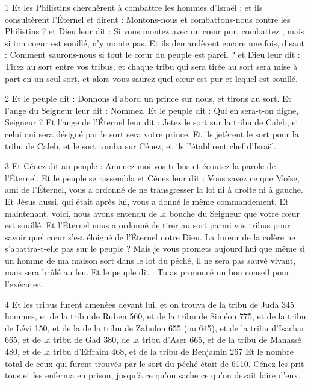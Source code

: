 
\par 1 Et les Philistins cherchèrent à combattre les hommes d'Israël ; et ils consultèrent l'Éternel et dirent : Montons-nous et combattons-nous contre les Philistins ? et Dieu leur dit : Si vous montez avec un cœur pur, combattez ; mais si ton coeur est souillé, n'y monte pas. Et ils demandèrent encore une fois, disant : Comment saurons-nous si tout le cœur du peuple est pareil ? et Dieu leur dit : Tirez au sort entre vos tribus, et chaque tribu qui sera tirée au sort sera mise à part en un seul sort, et alors vous saurez quel cœur est pur et lequel est souillé.

\par 2 Et le peuple dit : Donnons d'abord un prince sur nous, et tirons au sort. Et l'ange du Seigneur leur dit : Nommez. Et le peuple dit : Qui en sera-t-on digne, Seigneur ? Et l'ange de l'Éternel leur dit : Jetez le sort sur la tribu de Caleb, et celui qui sera désigné par le sort sera votre prince. Et ils jetèrent le sort pour la tribu de Caleb, et le sort tomba sur Cénez, et ils l'établirent chef d'Israël.

\par 3 Et Cénez dit au peuple : Amenez-moi vos tribus et écoutez la parole de l'Éternel. Et le peuple se rassembla et Cénez leur dit : Vous savez ce que Moïse, ami de l'Éternel, vous a ordonné de ne transgresser la loi ni à droite ni à gauche. Et Jésus aussi, qui était après lui, vous a donné le même commandement. Et maintenant, voici, nous avons entendu de la bouche du Seigneur que votre cœur est souillé. Et l'Éternel nous a ordonné de tirer au sort parmi vos tribus pour savoir quel cœur s'est éloigné de l'Éternel notre Dieu. La fureur de la colère ne s'abattra-t-elle pas sur le peuple ? Mais je vous promets aujourd'hui que même si un homme de ma maison sort dans le lot du péché, il ne sera pas sauvé vivant, mais sera brûlé au feu. Et le peuple dit : Tu as prononcé un bon conseil pour l'exécuter.

\par 4 Et les tribus furent amenées devant lui, et on trouva de la tribu de Juda 345 hommes, et de la tribu de Ruben 560, et de la tribu de Siméon 775, et de la tribu de Lévi 150, et de la de la tribu de Zabulon 655 (ou 645), et de la tribu d'Isachar 665, et de la tribu de Gad 380, de la tribu d'Aser 665, et de la tribu de Manassé 480, et de la tribu d'Effraim 468, et de la tribu de Benjamin 267 Et le nombre total de ceux qui furent trouvés par le sort du péché était de 6110. Cénez les prit tous et les enferma en prison, jusqu'à ce qu'on sache ce qu'on devait faire d'eux.

